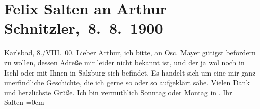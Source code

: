 

         
         \renewcommand{\erwaehntePersonen}{Personen: Oskar Mayer, Felix Salten}
         \renewcommand{\erwaehnteOrte}{Orte: Bad Ischl, Karlsbad, Salzburg}
         \renewcommand{\erwaehnteWerke}{}
               \section[ Felix Salten an Arthur Schnitzler, 8. 8. 1900]{ Felix Salten an Arthur Schnitzler, 8. 8. 1900}\nopagebreak{}\rehead{ }\begin{ledgroupsized}[t]{13cm}\normalsize\beginnumbering{} \toendnotes[C]{\smallbreak\pagebreak[2]} 
\toendnotes[C]{\smallbreak}\pstart
           \raggedleft{}{\pb}Karlsbad, 8./VIII. 00.\pend
           \pstart
           Lieber Arthur, ich bitte, \label{K_L03309-1v}\label{K_L03309-1h} an Osc. Mayer gütigst befördern zu wollen, dessen Adreße mir
               leider nicht bekannt ist, und der ja wol noch in Ischl oder mit Ihnen in Salzburg sich
               befindet. Es handelt sich um eine mir ganz unerfindliche Geschichte, die ich gerne so
               oder so aufgeklärt sähe.\pend
           \pstart
           Vielen Dank und herzlichste Grüße. Ich bin vermuthlich Sonntag oder Montag in \label{K_L03309-2v}\label{K_L03309-2h}.\pend
           \pstart
           Ihr {\\[\baselineskip]}\spacefill\mbox{Salten}\pend
           \leftskip=0em{}
         
         \endnumbering{}\end{ledgroupsized}  \newcommand{\dateiname}{L03309}\newcommand{\titel}{Felix Salten an Arthur Schnitzler, 8. 8. 1900}\newcommand{\editorInnen}{Martin Anton Müller und Laura Untner}
      